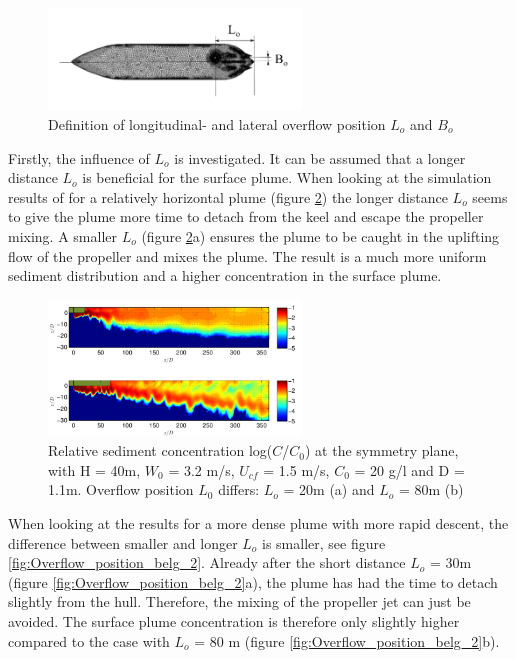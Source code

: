 \begin{figure}[ht!]
    \centering
    \includegraphics[width = 0.6\textwidth]{Images/Overflow_location_belg.png}
    \caption{Definition of longitudinal- and lateral overflow position $L_o$ and $B_o$}
    \label{fig:Overflow_location}
\end{figure}



\noindent Firstly, the influence of $L_o$ is investigated. It can be assumed that a longer distance $L_o$ is beneficial for the surface plume. When looking at the simulation results of \cite{Decrop} for a relatively horizontal plume (figure \ref{fig:Overflow_position_belg}) the longer distance $L_o$ seems to give the plume more time to detach from the keel and escape the propeller mixing. A smaller $L_o$ (figure \ref{fig:Overflow_position_belg}a) ensures the plume to be caught in the uplifting flow of the propeller and mixes the plume. The result is a much more uniform sediment distribution and a higher concentration in the surface plume.

\begin{figure}[ht!]
    \centering
    \includegraphics[width = 0.6\textwidth]{Images/Overflow_position_belg.png}
    \caption{Relative sediment concentration log($C$/$C_0$) at the symmetry plane, with H = 40m, $W_0$ = 3.2 m/s, $U_{cf}$ = 1.5 m/s, $C_0$ = 20 g/l and D = 1.1m. Overflow position $L_0$ differs: $L_o$ = 20m (a) and $L_o$ = 80m (b)}
    \label{fig:Overflow_position_belg}
\end{figure}


\noindent When looking at the results for a more dense plume with more rapid descent, the difference between smaller and longer $L_o$ is smaller, see figure \ref{fig:Overflow_position_belg_2}. Already after the short distance $L_o$ = 30m (figure \ref{fig:Overflow_position_belg_2}a), the plume has had the time to detach slightly from the hull. Therefore, the mixing of the propeller jet can just be avoided. The surface plume concentration is therefore only slightly higher compared to the case with $L_o$ = 80 m (figure \ref{fig:Overflow_position_belg_2}b). 

